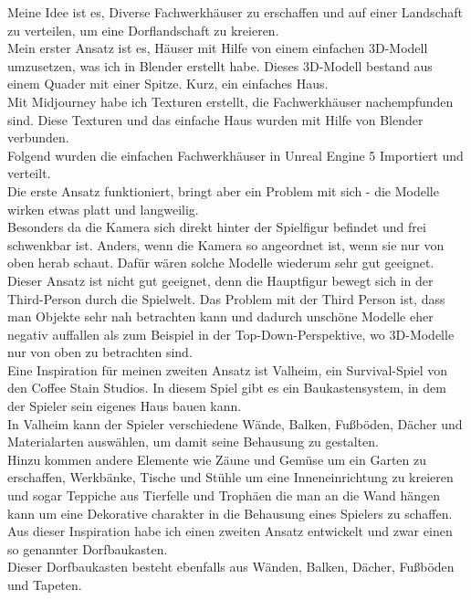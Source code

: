 \documentclass[10pt,a4paper,bibliography=totocnumbered,listof=totocnumbered]{scrartcl}
\begin{document}
Meine Idee ist es, Diverse Fachwerkhäuser zu erschaffen und auf einer Landschaft zu verteilen, um eine Dorflandschaft zu kreieren.
\\
Mein erster Ansatz ist es, Häuser mit Hilfe von einem einfachen 3D-Modell umzusetzen, was ich in Blender erstellt habe. Dieses 3D-Modell bestand aus einem Quader mit einer Spitze. Kurz, ein einfaches Haus.
\\
Mit Midjourney habe ich Texturen erstellt, die Fachwerkhäuser nachempfunden sind. Diese Texturen und das einfache Haus wurden mit Hilfe von Blender verbunden.
\\
Folgend wurden die einfachen Fachwerkhäuser in Unreal Engine 5 Importiert und verteilt.
\\
Die erste Ansatz funktioniert, bringt aber ein Problem mit sich - die Modelle wirken etwas platt und langweilig.
\\
Besonders da die Kamera sich direkt hinter der Spielfigur befindet und frei schwenkbar ist. Anders, wenn die Kamera so angeordnet ist, wenn sie nur von oben herab schaut. Dafür wären solche Modelle wiederum sehr gut geeignet.
\\
Dieser Ansatz ist nicht gut geeignet, denn die Hauptfigur bewegt sich in der Third-Person durch die Spielwelt. Das Problem mit der Third Person ist, dass man Objekte sehr nah betrachten kann und dadurch unschöne Modelle eher  negativ auffallen als zum Beispiel in der Top-Down-Perspektive, wo 3D-Modelle nur von oben zu betrachten sind.
\\
Eine Inspiration für meinen zweiten Ansatz ist Valheim, ein Survival-Spiel von den Coffee Stain Studios. In diesem Spiel gibt es ein Baukastensystem, in dem der Spieler sein eigenes Haus bauen kann.
\\
In Valheim kann der Spieler verschiedene Wände, Balken, Fußböden, Dächer und Materialarten auswählen, um damit seine Behausung zu gestalten.
\\
Hinzu kommen andere Elemente wie Zäune und Gemüse um ein Garten zu erschaffen, Werkbänke, Tische und Stühle um eine Inneneinrichtung zu kreieren und sogar Teppiche aus Tierfelle und Trophäen die man an die Wand hängen kann um eine Dekorative charakter in die Behausung eines Spielers zu schaffen.
\\
Aus dieser Inspiration habe ich einen zweiten Ansatz entwickelt und zwar einen so genannter Dorfbaukasten.
\\
Dieser Dorfbaukasten besteht ebenfalls aus Wänden, Balken, Dächer, Fußböden und Tapeten.
\\
\end{document}
